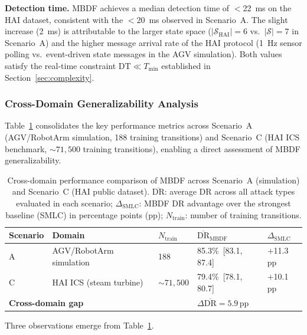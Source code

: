 \documentclass[manuscript,screen,review]{acmart}
\begin{document}
\textbf{Detection time.}
MBDF achieves a median detection time of $<$22~ms on the
HAI dataset, consistent with the $<$20~ms observed in
Scenario~A. The slight increase (2~ms) is attributable
to the larger state space
($|\mathcal{S}_{\mathrm{HAI}}| = 6$ vs.\
$|\mathcal{S}| = 7$ in Scenario~A) and the higher
message arrival rate of the HAI protocol (1~Hz sensor
polling vs.\ event-driven state messages in the AGV
simulation). Both values satisfy the real-time constraint
$\mathrm{DT} \ll T_{\min}$ established in
Section~\ref{sec:complexity}.

\subsubsection{Cross-Domain Generalizability Analysis}
\label{sec:generalizability}

Table~\ref{tab:cross_domain} consolidates the key
performance metrics across Scenario~A (AGV/RobotArm
simulation, 188 training transitions) and Scenario~C
(HAI ICS benchmark, ${\sim}71{,}500$ training
transitions), enabling a direct assessment of MBDF
generalizability.

\begin{table}[!t]
\renewcommand{\arraystretch}{1.3}
\caption{Cross-domain performance comparison of MBDF
across Scenario~A (simulation) and Scenario~C (HAI
public dataset). $\overline{\mathrm{DR}}$: average DR
across all attack types evaluated in each scenario;
$\Delta_{\mathrm{SMLC}}$: MBDF DR advantage over the
strongest baseline (SMLC) in percentage points (pp);
$N_{\mathrm{train}}$: number of training transitions.}
\label{tab:cross_domain}
\centering
\small
\begin{tabular}{lllll}
\toprule
\textbf{Scenario} & \textbf{Domain} &
$N_{\mathrm{train}}$ &
$\overline{\mathrm{DR}}_{\mathrm{MBDF}}$ &
$\Delta_{\mathrm{SMLC}}$ \\
\midrule
A & AGV/RobotArm simulation  & 188
  & 85.3\%\ [83.1,\,87.4] & $+$11.3\,pp \\
C & HAI ICS (steam turbine) & ${\sim}71{,}500$
  & 79.4\%\ [78.1,\,80.7] & $+$10.1\,pp \\
\midrule
\multicolumn{3}{l}{\textbf{Cross-domain gap}} &
\multicolumn{2}{l}{$\Delta\overline{\mathrm{DR}} = 5.9$\,pp} \\
\bottomrule
\end{tabular}
\end{table}

Three observations emerge from Table~\ref{tab:cross_domain}.
\end{document}
